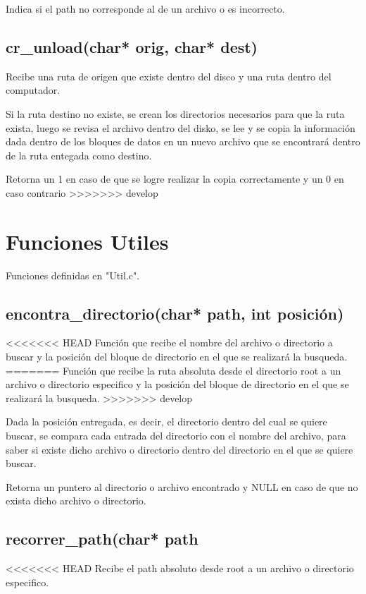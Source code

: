 \documentclass[12pt]{article}
\begin{document}
Indica si el path no corresponde al de un archivo o es incorrecto.

\subsection{cr\_unload(char* orig, char* dest)}
Recibe una ruta de origen que existe dentro del disco y una ruta dentro del computador.

Si la ruta destino no existe, se crean los directorios necesarios para que la ruta exista, luego se revisa el archivo dentro del disko, se lee y se copia la información dada dentro de los bloques de datos en un nuevo archivo que se encontrará dentro de la ruta entegada como destino.

Retorna un 1 en caso de que se logre realizar la copia correctamente y un 0 en caso contrario
>>>>>>> develop

\section{Funciones Utiles}
Funciones definidas en "Util.c".

\subsection{encontra\_directorio(char* path, int posición)}
<<<<<<< HEAD
Función que recibe el nombre del archivo o directorio a buscar y la posición del bloque de directorio en el que se realizará la busqueda. 
=======
Función que recibe la ruta absoluta desde el directorio root a un archivo o directorio especifico y la posición del bloque de directorio en el que se realizará la busqueda. 
>>>>>>> develop

Dada la posición entregada, es decir, el directorio dentro del cual se quiere buscar, se compara cada entrada del directorio con el nombre del archivo, para saber si existe dicho archivo o directorio dentro del directorio en el que se quiere buscar. 

Retorna un puntero al directorio o archivo encontrado y NULL en caso de que no exista dicho archivo o directorio.

\subsection{recorrer\_path(char* path}
<<<<<<< HEAD
Recibe el path absoluto desde root a un archivo o directorio especifico. 
\end{document}
